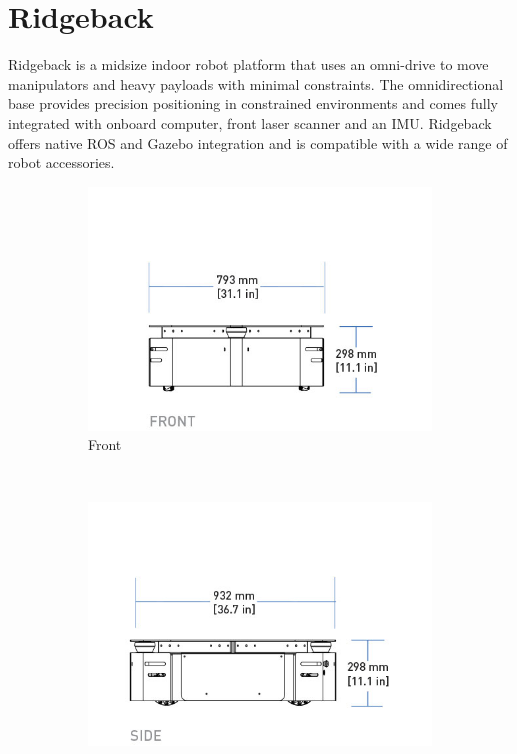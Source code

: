 \documentclass[times, utf8, diplomski, english]{fer}
\begin{document}
\section{Ridgeback} 
Ridgeback is a midsize indoor robot platform that uses an omni-drive to move manipulators and heavy payloads with minimal constraints. 
The omnidirectional base provides precision positioning in constrained environments and comes fully integrated with onboard computer, front laser scanner and an IMU. 
Ridgeback offers native ROS and Gazebo integration and is compatible with a wide range of robot accessories.
\begin{figure}[h]
    \centering
        \begin{subfigure}[t]{0.34\textwidth}
        \includegraphics[width=\textwidth]{rb_front}
        \caption{Front}
    \end{subfigure}
    ~
    \begin{subfigure}[t]{0.34\textwidth}
        \includegraphics[width=\textwidth]{rb_side}

\end{subfigure}
\end{figure}
\end{document}
